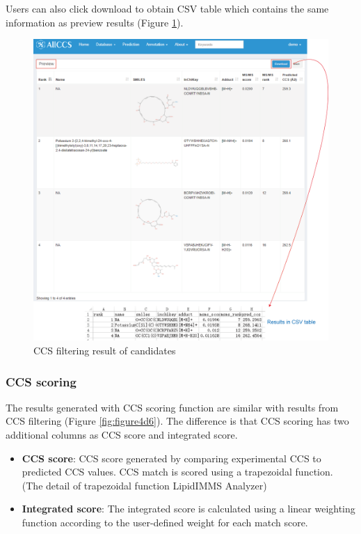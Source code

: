 \documentclass[12pt,]{book}
\providecommand{\tightlist}{%
  \setlength{\itemsep}{0pt}\setlength{\parskip}{0pt}}
\begin{document}
Users can also click download to obtain CSV table which contains the
same information as preview results (Figure \ref{fig:figure4d5}).

\begin{figure}

{\centering \includegraphics{images/chapter4/figure4.5candidate_rank_filter} 

}

\caption{CCS filtering result of candidates}\label{fig:figure4d5}
\end{figure}

\subsubsection{CCS scoring}\label{chapter4d2d3d2}

The results generated with CCS scoring function are similar with results
from CCS filtering (Figure \ref{fig:figure4d6}). The difference is that
CCS scoring has two additional columns as CCS score and integrated
score.

\begin{itemize}
\tightlist
\item
  \textbf{CCS score}: CCS score generated by comparing experimental CCS
  to predicted CCS values. CCS match is scored using a trapezoidal
  function. (The detail of trapezoidal function LipidIMMS Analyzer)
\item
  \textbf{Integrated score}: The integrated score is calculated using a
  linear weighting function according to the user-defined weight for
  each match score.
\end{itemize}
\end{document}
